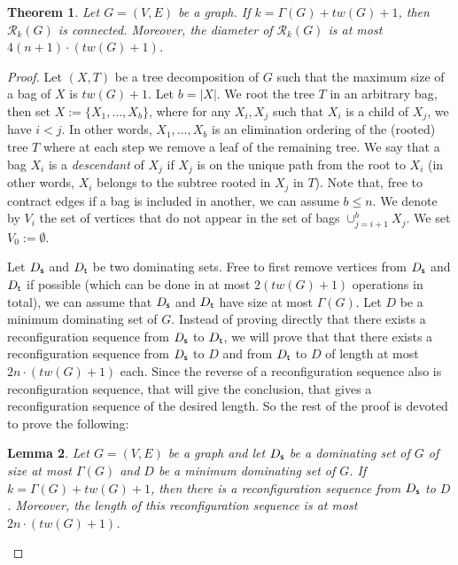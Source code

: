 \documentclass[10pt]{article}
\newtheorem{theorem}{Theorem}
\newtheorem{lemma}[theorem]{Lemma}
\newcommand{\source}{{\sf s}}
\newcommand{\target}{{\sf t}}
\begin{document}
\begin{theorem}\label{them:twUB}
Let $G=(V,E)$ be a graph. If $k = \Gamma(G)+ tw(G) + 1$, then $\mathcal{R}_k(G)$ is connected. Moreover, the diameter of $\mathcal{R}_k(G)$ is at most $4(n+1) \cdot (tw(G)+1)$.
\end{theorem}

\begin{proof}
Let $(X,T)$ be a tree decomposition of $G$ such that the maximum size of a bag of $X$ is $tw(G)+1$. Let $b=|X|$. We root the tree $T$ in an arbitrary bag, then set $X:=\{X_1,\ldots,X_b\}$, where for any $X_i,X_j$ such that $X_i$ is a child of $X_j$, we have $i<j$. In other words, $X_1,\ldots,X_b$ is an elimination ordering of the (rooted) tree $T$ where at each step we remove a leaf of the remaining tree. We say that a bag $X_i$ is a \emph{descendant} of $X_j$ if $X_j$ is on the unique path from the root to $X_i$ (in other words, $X_i$ belongs to the subtree rooted in $X_j$ in $T$). Note that, free to contract edges if a bag is included in another, we can assume $b\leq n$. We denote by $V_i$ the set of vertices that do not appear in the set of bags $\cup_{j=i+1}^b X_j$. We set $V_0:= \emptyset$.

Let $D_\source$ and $D_\target$ be two dominating sets. Free to first remove vertices from $D_\source$ and $D_\target$ if possible (which can be done in at most $2(tw(G)+1)$ operations in total), we can assume that $D_\source$ and $D_\target$ have size at most $\Gamma(G)$. Let $D$ be a minimum dominating set of $G$. Instead of proving directly that there exists a reconfiguration sequence from $D_\source$ to $D_\target$, we will prove that that there exists a reconfiguration sequence from $D_\source$ to $D$ and from $D_\target$ to $D$ of length at most $2n \cdot (tw(G)+1)$ each. Since the reverse of a reconfiguration sequence also is reconfiguration sequence, that will give the conclusion, that gives a reconfiguration sequence of the desired length. So the rest of the proof is devoted to prove the following:

\begin{lemma}\label{lem:bdtw}
Let $G=(V,E)$ be a graph and let $D_\source$ be a dominating set of $G$ of size at most $\Gamma(G)$ and $D$ be a minimum dominating set of $G$. If $k = \Gamma(G)+ tw(G) + 1$, then there is a reconfiguration sequence from $D_\source$ to $D$. Moreover, the length of this reconfiguration sequence is at most $2n \cdot (tw(G)+1)$.
\end{lemma}


\end{proof}
\end{document}
